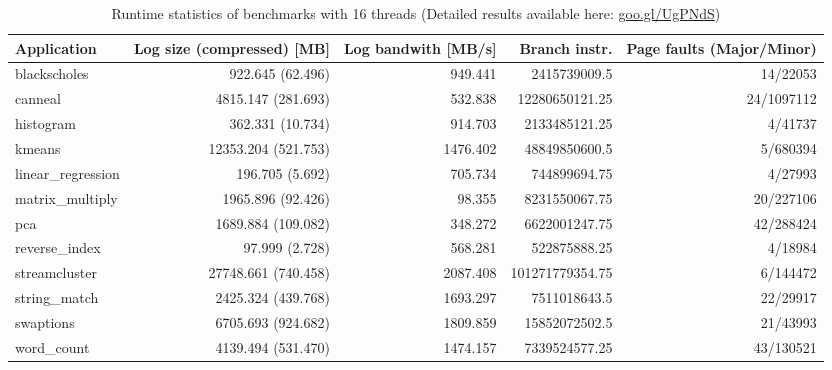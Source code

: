 \begin{table*}[t]
\footnotesize
\centering

\begin{tabular}{l | r r r r}
    Application& Log size (compressed) [MB]& Log bandwith [MB/s]& Branch instr.& Page faults (Major/Minor) \\
  \hline \hline
    blackscholes& 922.645 (62.496)& 949.441& 2415739009.5& 14/22053 \\
    canneal& 4815.147 (281.693)& 532.838& 12280650121.25& 24/1097112 \\
    histogram& 362.331 (10.734)& 914.703& 2133485121.25& 4/41737 \\
    kmeans& 12353.204 (521.753)& 1476.402& 48849850600.5& 5/680394 \\
    linear\_regression& 196.705 (5.692)& 705.734& 744899694.75& 4/27993 \\
    matrix\_multiply& 1965.896 (92.426)& 98.355& 8231550067.75& 20/227106 \\
    pca& 1689.884 (109.082)& 348.272& 6622001247.75& 42/288424 \\
    reverse\_index& 97.999 (2.728)& 568.281& 522875888.25& 4/18984 \\
    streamcluster& 27748.661 (740.458)& 2087.408& 101271779354.75& 6/144472 \\
    string\_match& 2425.324 (439.768)& 1693.297& 7511018643.5& 22/29917 \\
    swaptions& 6705.693 (924.682)& 1809.859& 15852072502.5& 21/43993 \\
    word\_count& 4139.494 (531.470)& 1474.157& 7339524577.25& 43/130521 \\

\hline
\end{tabular}

\caption{Runtime statistics of benchmarks with 16 threads (Detailed results available here: \href{https://goo.gl/UgPNdS}{goo.gl/UgPNdS})}
\label{tab:apps}

\end{table*}
